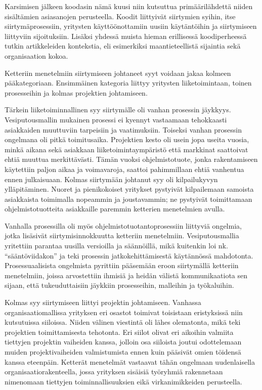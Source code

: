 \documentclass[12pt]{article}
\begin{document}
Karsimisen jälkeen koodasin nämä kuusi niin kutsuttua
primäärilähdettä niiden sisältämien asiasanojen perusteella.
Koodit liittyivät siirtymien syihin, itse siirtymäprosessiin,
yritysten käyttöönottamiin uusiin käytäntöihin ja siirtymiseen
liittyviin sijoituksiin. Lisäksi yhdessä muista hieman erillisessä
koodiperheessä tutkin artikkeleiden kontekstia, eli esimerkiksi
maantieteellistä sijaintia sekä organisaation kokoa.

Ketteriin menetelmiin siirtymiseen johtaneet syyt voidaan jakaa
kolmeen pääkategoriaan. Ensimmäinen kategoria liittyy yritysten
liiketoimintaan, toinen prosesseihin ja kolmas projektien johtamiseen.

Tärkein liiketoiminnallinen syy siirtymälle oli vanhan prosessin
jäykkyys. Vesiputousmallin mukainen prosessi ei kyennyt vastaamaan
tehokkaasti asiakkaiden muuttuviin tarpeisiin ja vaatimuksiin. Toiseksi
vanhan prosessin ongelmana oli pitkä toimitusaika. Projektien
kesto oli usein jopa useita vuosia, minkä aikana sekä asiakkaan
liiketoimintaympäristö että markkinat saattoivat ehtiä muuttua
merkittävästi. Tämän vuoksi ohjelmistotuote, jonka rakentamiseen
käytettiin paljon aikaa ja voimavaroja, saattoi pahimmillaan ehtiä
vanhentua ennen julkaisuaan. Kolmas siirtymään johtanut syy oli
kilpailukyvyn ylläpitäminen. Nuoret ja pienikokoiset yritykset
pystyivät kilpailemaan samoista asiakkaista toimimalla nopeammin ja
joustavammin; ne pystyivät toimittamaan ohjelmistotuotteita asiakkaille
paremmin ketterien menetelmien avulla.

Vanhalla prosessilla oli myös ohjelmistotuotantoprosessiin
liittyviä ongelmia, jotka lisäsivät siirtymisinnokkuutta ketteriin
menetelmiin. Vesiputousmallia yritettiin parantaa uusilla versioilla
ja säännöillä, mikä kuitenkin loi nk. ``sääntöviidakon'' ja
teki prosessin jatkokehittämisestä käytännössä mahdotonta.
Prosessuaalisista ongelmista pyrittiin pääsemään eroon siirtymällä
ketteriin menetelmiin, joissa arvostettiin ihmisiä ja heidän
välistä kommunikaatiota sen sijaan, että tukeuduttaisiin jäykkiin
prosesseihin, malleihin ja työkaluihin.

Kolmas syy siirtymiseen liittyi projektin johtamiseen. Vanhassa
organisaatiomallissa yrityksen eri osastot toimivat toisistaan
eristyksissä niin kutsutuissa siiloissa. Niiden välinen viestintä
oli lähes olematonta, mikä teki projektien toimittamisesta
tehotonta. Eri siilot olivat eri aikoihin valmiita tiettyjen projektin
vaiheiden kanssa, jolloin osa siiloista joutui odottelemaan muiden
projektivaiheiden valmistumista ennen kuin pääsivät omien töidensä
kanssa eteenpäin. Ketterät menetelmät vastaavat tähän ongelmaan
uudenlaisella organisaatiorakenteella, jossa yrityksen sisäisiä
työryhmiä rakennetaan nimenomaan tiettyjen toiminnallisuuksien eikä
virkanimikkeiden perusteella.
\end{document}
